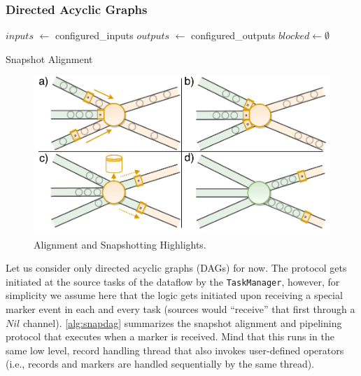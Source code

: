 \subsubsection{Directed Acyclic Graphs}

\begin{algorithm}
$inputs$ $\leftarrow$ configured\_inputs\;
$outputs$ $\leftarrow$ configured\_outputs\;
$blocked \leftarrow \emptyset$ \;

\caption{Snapshot Alignment}
\label{alg:snapdag}
\end{algorithm}

\begin{figure}[t]
\centering
\includegraphics[width=\textwidth / 2]{figures/snapshots-highlights.pdf}
\caption{Alignment and Snapshotting Highlights.} 
\label{fig:snapshots-highlights}
\vspace{-4mm}
\end{figure}

Let us consider only directed acyclic graphs (DAGs) for now. The protocol gets initiated at the source tasks of the dataflow by the \texttt{TaskManager}, however, for simplicity we assume here that the logic gets initiated upon receiving a special marker event in each and every task (sources would ``receive'' that first through a $Nil$ channel). \autoref{alg:snapdag} summarizes the snapshot alignment and pipelining protocol that executes when a marker is received. Mind that this runs in the same low level, record handling thread that also invokes user-defined operators (i.e., records and markers are handled sequentially by the same thread). 

